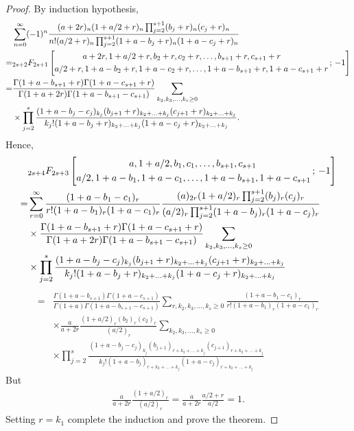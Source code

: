 \documentclass[reqno]{amsart}
\theoremstyle{definition}
\theoremstyle{remark}
\numberwithin{equation}{section}
\begin{document}
\begin{proof}
By induction hypothesis,
\begin{align*}
&\sum_{n=0}^{\infty}(-1)^n\frac{(a+2r)_{n}(1+a/2+r)_{n}  {\displaystyle} \prod_{j=2}^{s+1}(b_j+r)_{n}(c_j+r)_{n}}{n! (a/2+r)_{n}  {\displaystyle}\prod_{j=2}^{s+1}(1+a-b_j+r)_{n}(1+a-c_j+r)_{n}}\\
=&_{2s+2}F_{2s+1}\left[\begin{aligned}a+2r, 1+a/2+r, b_2+r, c_2+r, \ldots, b_{s+1}+r, c_{s+1}+r \hspace{2cm}\\a/2+r, 1+a-b_2+r, 1+a-c_2+r, \ldots, 1+a-b_{s+1}+r, 1+a-c_{s+1}+r \end{aligned}\,;\,-1\right]\\
=&\frac{\Gamma(1+a-b_{s+1}+r)\Gamma(1+a-c_{s+1}+r)}{\Gamma(1+a+2r)\Gamma(1+a-b_{s+1}-c_{s+1})}\sum_{k_2, k_3, \ldots, k_s\geq 0} \\
&\times \prod_{j=2}^s \frac{(1+a-b_j-c_j)_{k_j}(b_{j+1}+r)_{k_2+\ldots+k_j}(c_{j+1}+r)_{k_2+\ldots+k_j}}{k_j!(1+a-b_j+r)_{k_2+\ldots+k_j}(1+a-c_j+r)_{k_2+\ldots+k_j}}.
\end{align*}
Hence,
\begin{align*}
&_{2s+4}F_{2s+3}\left[\begin{aligned}a, 1+a/2, b_1, c_1, \ldots, b_{s+1}, c_{s+1}\hspace{2cm}\\a/2, 1+a-b_1, 1+a-c_1, \ldots, 1+a-b_{s+1}, 1+a-c_{s+1}\end{aligned}\,;\,-1\right]\\
=&\sum_{r=0}^{\infty}\frac{(1+a-b_1-c_1)_r  }{r! (1+a-b_1)_r(1+a-c_1)_r}\frac{(a)_{2r}(1+a/2)_{r} {\displaystyle} \prod_{j=2}^{s+1}(b_j)_{r}(c_j)_{r}}{ (a/2)_{r} {\displaystyle}\prod_{j=2}^{s+1}(1+a-b_j)_{r}(1+a-c_j)_{r}}\\
&\times \frac{\Gamma(1+a-b_{s+1}+r)\Gamma(1+a-c_{s+1}+r)}{\Gamma(1+a+2r)\Gamma(1+a-b_{s+1}-c_{s+1})}\sum_{k_2, k_3, \ldots, k_s\geq 0}\\
&\times \prod_{j=2}^s \frac{(1+a-b_j-c_j)_{k_j}(b_{j+1}+r)_{k_2+\ldots+k_j}(c_{j+1}+r)_{k_2+\ldots+k_j}}{k_j!(1+a-b_j+r)_{k_2+\ldots+k_j}(1+a-c_j+r)_{k_2+\ldots+k_j}}\end{align*}\begin{align*}
=&\frac{\Gamma(1+a-b_{s+1})\Gamma(1+a-c_{s+1})}{\Gamma(1+a)\Gamma(1+a-b_{s+1}-c_{s+1})}\sum_{r, k_2, k_3, \ldots, k_s\geq 0}\frac{(1+a-b_1-c_1)_r  }{r! (1+a-b_1)_r(1+a-c_1)_r}\\&\times\frac{a}{a+2r}\frac{ (1+a/2)_{r}(b_2)_{r}(c_2)_{r}}{ (a/2)_{r} }\sum_{k_2, k_3, \ldots, k_s\geq 0}\\
&\times \prod_{j=2}^s \frac{(1+a-b_j-c_j)_{k_j}(b_{j+1})_{r+k_2+\ldots+k_j}(c_{j+1})_{r+k_2+\ldots+k_j}}{k_j!(1+a-b_j)_{r+k_2+\ldots+k_j}(1+a-c_j)_{r+k_2+\ldots+k_j}}
\end{align*}
But
\begin{align*}
\frac{a}{a+2r}\frac{ (1+a/2)_{r}}{ (a/2)_{r} }=\frac{a}{a+2r}\frac{a/2+r}{a/2}=1.
\end{align*} Setting $r=k_1$ complete the induction and prove the theorem.
\end{proof}
\end{document}
